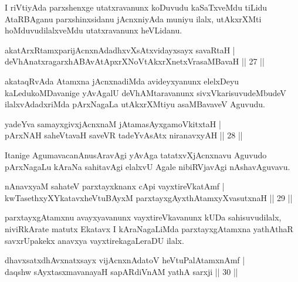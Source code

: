 \begin{artha}
I riVtiyAda parxshenxge utatxravanunx koDuvudu kaSaTxveMdu tiLidu AtaRBAganu 
parxshinxsidanu jAcnxniyAda muniyu ilalx, utAkxrXMti hoMduvudilalxveMdu utatxravanunx 
heVLidanu.
\end{artha}

\begin{shl}
akatArxRtamxparijAcnxnAdadhxvXsAtxvidayxsayx savaRtaH |\\
deVhAnatxragarxhABAvAtApxrXNoVtAkxrXnetxVrasaMBavaH \hfill || 27 ||
\end{shl}

\begin{artha}
akataqRvAda Atamxna jAcnxnadiMda avideyxyanunx elelxDeyu kaLedukoMDavanige yAvAgalU deVhAMtaravanunx sivxVkarisuvudeMbudeV ilalxvAdadxriMda pArxNagaLa utAkxrXMtiyu asaMBavaveV Aguvudu.
\end{artha}

\begin{shl}
yadeYva samayxgivxjAcnxnaM jAtamasAyx\s \s gamoVkitxtaH |\\
pArxNAH saheVtavaH saveVR tadeYvAsAtx niranavxyAH \hfill || 28 ||
\end{shl}

\begin{artha}
Itanige AgumavacanAnusAravAgi yAvAga tatatxvXjAcnxnavu Aguvudo pArxNagaLu kAraNa sahitavAgi elalxvU Agale nibiRVjavAgi nAshavAguvavu.
\end{artha}

\begin{shl}
nAnavxyaM sahateV parxtayxknanx cApi vayxtireVkatAmf |\\
kwTasethxyXYkatavxheVtuBAyxM parxtayxgAyxthAtamxyXvasutxnaH \hfill || 29 ||
\end{shl}

\begin{artha}
parxtayxgAtamxnu avayxyavanunx vayxtireVkavanunx kUDa sahisuvudilalx, niviRkArate matutx Ekatavx I kAraNagaLiMda parxtayxgAtamxna yathAthaR savxrUpakekx anavxya vayxtirekagaLeraDU ilalx.
\end{artha}


\begin{shl}
dhavxsatxdhAvxnatxsayx vijAcnxnAdatoV heVtuPalAtamxnAmf |\\
daqshw sAyxtasxmavanayaH sapARdiVnAM yathA sarxji \hfill || 30 ||
\end{shl}

